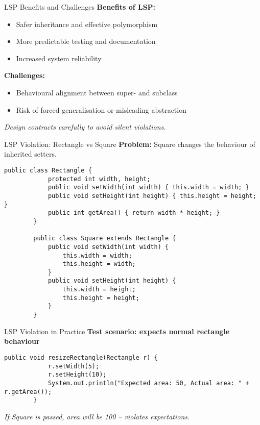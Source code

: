 \documentclass[aspectratio=169, table]{beamer}
\begin{document}
\begin{frame}[fragile]{LSP Benefits and Challenges}
	\vspace{20pt}
	\textbf{Benefits of LSP:}
	\begin{itemize}
		\item Safer inheritance and effective polymorphism
		\item More predictable testing and documentation
		\item Increased system reliability
	\end{itemize}
	
	\textbf{Challenges:}
	\begin{itemize}
		\item Behavioural alignment between super- and subclass
		\item Risk of forced generalisation or misleading abstraction
	\end{itemize}
	
	\textit{Design contracts carefully to avoid silent violations.}
\end{frame}

\begin{frame}[fragile]{LSP Violation: Rectangle vs Square}
	\vspace{20pt}
	\textbf{Problem:} Square changes the behaviour of inherited setters.
	
	\begin{lstlisting}[style=JavaStyle]
		public class Rectangle {
			protected int width, height;
			public void setWidth(int width) { this.width = width; }
			public void setHeight(int height) { this.height = height; }
			public int getArea() { return width * height; }
		}
		
		public class Square extends Rectangle {
			public void setWidth(int width) {
				this.width = width;
				this.height = width;
			}
			public void setHeight(int height) {
				this.width = height;
				this.height = height;
			}
		}
	\end{lstlisting}
\end{frame}

\begin{frame}[fragile]{LSP Violation in Practice}
	\vspace{20pt}
	\textbf{Test scenario: expects normal rectangle behaviour}
	
	\begin{lstlisting}[style=JavaStyle]
		public void resizeRectangle(Rectangle r) {
			r.setWidth(5);
			r.setHeight(10);
			System.out.println("Expected area: 50, Actual area: " + r.getArea());
		}
	\end{lstlisting}
	
	\textit{If Square is passed, area will be 100 – violates expectations.}
\end{frame}
\end{document}
